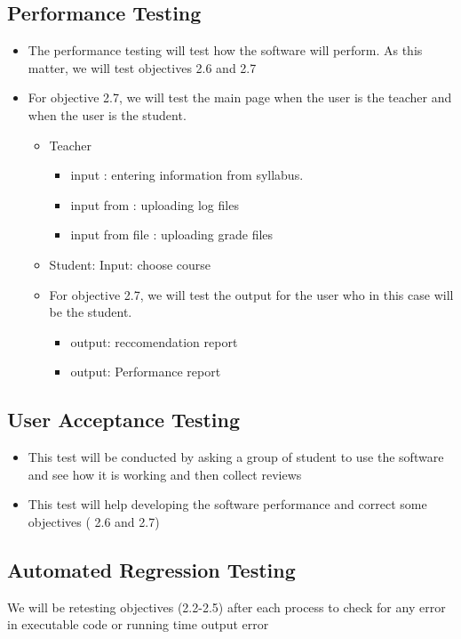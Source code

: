 \documentclass[12pt]{article}
\begin{document}
\subsection{Performance Testing}
\begin{itemize}
	\item The performance testing will test how the software will perform. As this matter, we will test objectives 2.6 and 2.7
	\item For objective 2.7, we will test the main page when the user is the teacher and when the user is the student. 
	\begin{itemize}
		\item Teacher
		\begin{itemize}
		\item input : entering information from syllabus. 
		\item input from : uploading log files
		\item input from file : uploading grade files
		\end{itemize}
		\item Student: Input: choose course
		\item For objective 2.7, we will test the output for the user who in this case will be the student.
		\begin{itemize}
		\item output: reccomendation report
		\item output: Performance report
		\end{itemize}
	\end{itemize}
\end{itemize}

\subsection{User Acceptance Testing}
\begin{itemize}
	\item This test will be conducted by asking a group of student to use the software and see how it is working and then collect reviews
	\item This test will help developing the software performance and correct some objectives ( 2.6 and 2.7)
\end{itemize}

\subsection{Automated Regression Testing}
We will be retesting objectives (2.2-2.5) after each process to check for any error in executable code or running time output error
\end{document}
